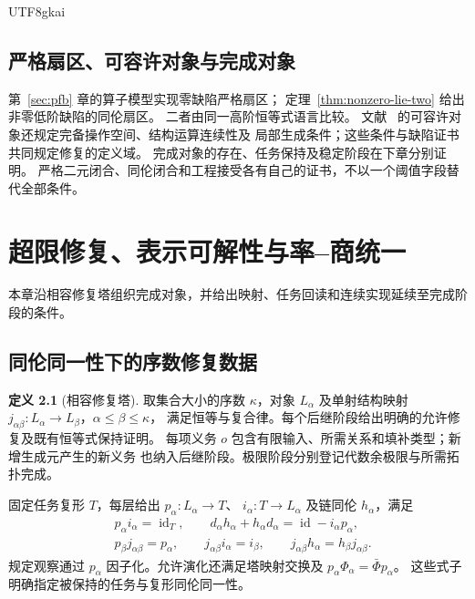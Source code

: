 \documentclass[12pt]{report}
\theoremstyle{definition}
\newtheorem{definition}{定义}[chapter]
\newcommand{\id}{\operatorname{id}}
\begin{document}
\begin{CJK*}{UTF8}{gkai}
\section{严格扇区、可容许对象与完成对象}
第~\ref{sec:pfb} 章的算子模型实现零缺陷严格扇区；
定理~\ref{thm:nonzero-lie-two} 给出非零低阶缺陷的同伦扇区。
二者由同一高阶恒等式语言比较。
文献~\cite{pure} 的可容许对象还规定完备操作空间、结构运算连续性及
局部生成条件；这些条件与缺陷证书共同规定修复的定义域。
完成对象的存在、任务保持及稳定阶段在下章分别证明。
严格二元闭合、同伦闭合和工程接受各有自己的证书，不以一个阈值字段替代全部条件。

\chapter{超限修复、表示可解性与率--商统一}
\label{sec:transfinite-calculus}
本章沿相容修复塔组织完成对象，并给出映射、任务回读和连续实现延续至完成阶段的条件。

\section{同伦同一性下的序数修复数据}
\begin{definition}[相容修复塔]
取集合大小的序数 \(\kappa\)，对象 \(L_\alpha\) 及单射结构映射
\(j_{\alpha\beta}:L_\alpha\to L_\beta\)，\(\alpha\le\beta\le\kappa\)，
满足恒等与复合律。每个后继阶段给出明确的允许修复及既有恒等式保持证明。
每项义务 \(o\) 包含有限输入、所需关系和填补类型；新增生成元产生的新义务
也纳入后继阶段。极限阶段分别登记代数余极限与所需拓扑完成。

固定任务复形 \(T\)，每层给出 \(p_\alpha:L_\alpha\to T\)、
\(i_\alpha:T\to L_\alpha\) 及链同伦 \(h_\alpha\)，满足
\[
\begin{aligned}
&p_\alpha i_\alpha=\id_T,\qquad
 d_\alpha h_\alpha+h_\alpha d_\alpha=\id-i_\alpha p_\alpha,\\
&p_\beta j_{\alpha\beta}=p_\alpha,\qquad
 j_{\alpha\beta}i_\alpha=i_\beta,\qquad
 j_{\alpha\beta}h_\alpha=h_\beta j_{\alpha\beta}.
\end{aligned}
\]
规定观察通过 \(p_\alpha\) 因子化。允许演化还满足塔映射交换及
\(p_\alpha\Phi_\alpha=\bar\Phi p_\alpha\)。
这些式子明确指定被保持的任务与复形同伦同一性。
\end{definition}


\end{CJK*}
\end{document}
